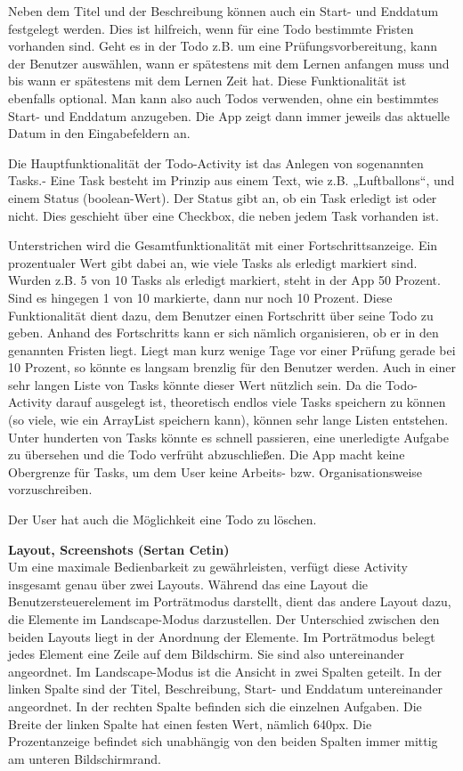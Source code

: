 Neben dem Titel und der Beschreibung können auch ein Start- und Enddatum festgelegt werden. Dies ist hilfreich, wenn für eine Todo bestimmte Fristen vorhanden sind. Geht es in der Todo z.B. um eine Prüfungsvorbereitung, kann der Benutzer auswählen, wann er spätestens mit dem Lernen anfangen muss und bis wann er spätestens mit dem Lernen Zeit hat. Diese Funktionalität ist ebenfalls optional. Man kann also auch Todos verwenden, ohne ein bestimmtes Start- und Enddatum anzugeben. Die App zeigt dann immer jeweils das aktuelle Datum in den Eingabefeldern an.

Die Hauptfunktionalität der Todo-Activity ist das Anlegen von sogenannten Tasks.- Eine Task besteht im Prinzip aus einem Text, wie z.B. „Luftballons“, und einem Status (boolean-Wert). Der Status gibt an, ob ein Task erledigt ist oder nicht. Dies geschieht über eine Checkbox, die neben jedem Task vorhanden ist.

Unterstrichen wird die Gesamtfunktionalität mit einer Fortschrittsanzeige. Ein prozentualer Wert gibt dabei an, wie viele Tasks als erledigt markiert sind. Wurden z.B. 5 von 10 Tasks als erledigt markiert, steht in der App 50 Prozent. Sind es hingegen 1 von 10 markierte, dann nur noch 10 Prozent. Diese Funktionalität dient dazu, dem Benutzer einen Fortschritt über seine Todo zu geben. Anhand des Fortschritts kann er sich nämlich organisieren, ob er in den genannten Fristen liegt. Liegt man kurz wenige Tage vor einer Prüfung gerade bei 10 Prozent, so könnte es langsam brenzlig für den Benutzer werden. Auch in einer sehr langen Liste von Tasks könnte dieser Wert nützlich sein. Da die Todo-Activity darauf ausgelegt ist, theoretisch endlos viele Tasks speichern zu können (so viele, wie ein ArrayList speichern kann), können sehr lange Listen entstehen. Unter hunderten von Tasks könnte es schnell passieren, eine unerledigte Aufgabe zu übersehen und die Todo verfrüht abzuschließen. Die App macht keine Obergrenze für Tasks, um dem User keine Arbeits- bzw. Organisationsweise vorzuschreiben.

Der User hat auch die Möglichkeit eine Todo zu löschen.

\textbf{Layout, Screenshots (Sertan Cetin)}\\
Um eine maximale Bedienbarkeit zu gewährleisten, verfügt diese Activity insgesamt genau über zwei Layouts. Während das eine Layout die Benutzersteuerelement im Porträtmodus darstellt, dient das andere Layout dazu, die Elemente im Landscape-Modus darzustellen. Der Unterschied zwischen den beiden Layouts liegt in der Anordnung der Elemente. Im Porträtmodus belegt jedes Element eine Zeile auf dem Bildschirm. Sie sind also untereinander angeordnet. Im Landscape-Modus ist die Ansicht in zwei Spalten geteilt. In der linken Spalte sind der Titel, Beschreibung, Start- und Enddatum untereinander angeordnet. In der rechten Spalte befinden sich die einzelnen Aufgaben. Die Breite der linken Spalte hat einen festen Wert, nämlich 640px. Die Prozentanzeige befindet sich unabhängig von den beiden Spalten immer mittig am unteren Bildschirmrand.

